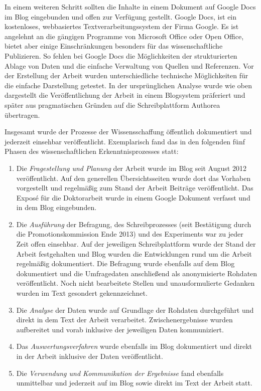 In einem weiteren Schritt sollten die Inhalte in einem Dokument auf Google Docs im Blog eingebunden und offen zur Verfügung gestellt. Google Docs, ist ein kostenloses, webbasiertes Textverarbeitungssystem der Firma Google. Es ist angelehnt an die gängigen Programme von Microsoft Office oder Open Office, bietet aber einige Einschränkungen besonders für das wissenschaftliche Publizieren. So fehlen bei Google Docs die Möglichkeiten der strukturierten Ablage von Daten und die einfache Verwaltung von Quellen und Referenzen. Vor der Erstellung der Arbeit wurden unterschiedliche technische Möglichkeiten für die einfache Darstellung getestet. In der ursprünglichen Analyse wurde wie oben dargestellt die Veröffentlichung der Arbeit in einem Blogsystem präferiert und später aus pragmatischen Gründen auf die Schreibplattform Authorea übertragen.

Insgesamt wurde der Prozesse der Wissensschaffung öffentlich dokumentiert und jederzeit einsehbar veröffentlicht. Exemplarisch fand das in den folgenden fünf Phasen des wissenschaftlichen Erkenntnisprozesses statt:
\begin{enumerate}
\item Die \textit{Fragestellung und Planung} der Arbeit wurde im Blog seit August 2012 veröffentlicht. Auf den generellen Übersichtsseiten wurde dort das Vorhaben vorgestellt und regelmäßig zum Stand der Arbeit Beiträge veröffentlicht. Das Exposé für die Doktorarbeit wurde in einem Google Dokument verfasst und in dem Blog eingebunden.
\item Die \textit{Ausführung} der Befragung, des Schreibprozesses (seit Bestätigung durch die Promotionskommission Ende 2013) und des Experiments war zu jeder Zeit offen einsehbar. Auf der jeweiligen Schreibplattform wurde der Stand der Arbeit festgehalten und Blog wurden die Entwicklungen rund um die Arbeit regelmäßig dokumentiert. Die Befragung wurde ebenfalls auf dem Blog dokumentiert und die Umfragedaten anschließend als anonymisierte Rohdaten veröffentlicht. Noch nicht bearbeitete Stellen und unausformulierte Gedanken wurden im Text gesondert gekennzeichnet.
\item Die \textit{Analyse} der Daten wurde auf Grundlage der Rohdaten durchgeführt und direkt in dem Text der Arbeit verarbeitet. Zwischenergebnisse wurden aufbereitet und vorab inklusive der jeweiligen Daten kommuniziert.
\item Das \textit{Auswertungsverfahren} wurde ebenfalls im Blog dokumentiert und direkt in der Arbeit inklusive der Daten veröffentlicht.
\item Die \textit{Verwendung und Kommunikation der Ergebnisse} fand ebenfalls unmittelbar und jederzeit auf im Blog sowie direkt im Text der Arbeit statt.
\end{enumerate}

